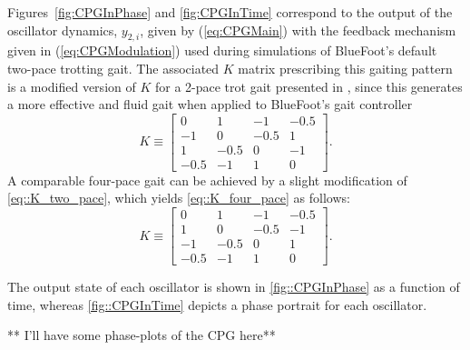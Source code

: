 			Figures~\ref{fig:CPGInPhase} and \ref{fig:CPGInTime} correspond to the output of the oscillator dynamics, $y_{2,i}$, given by (\ref{eq:CPGMain}) with the feedback mechanism given in (\ref{eq:CPGModulation})  used during simulations of BlueFoot's default two-pace trotting gait. The associated $K$ matrix prescribing this gaiting pattern is a modified version of $K$ for a 2-pace trot gait presented in \cite{Rutishauser2008}, since this generates a more effective and fluid gait when applied to BlueFoot's gait controller
				\begin{equation}
						K\equiv 
						\left[ 
						\begin{array}{cccc}
						 0	   	&	 1   	&	 	-1   	&		-0.5\\
						-1	   	&	 0   	&	 	-0.5   	&		 1 	\\
						 1    	&	-0.5   	&		0    	&	 	-1 	\\
						-0.5	&	-1   	&		1    	&		 0
						\end{array}
						\right].
						\label{eq::K_two_pace}
				\end{equation}
			A comparable four-pace gait can be achieved by a slight modification of \ref{eq::K_two_pace}, which yields \ref{eq::K_four_pace} as follows:
				\begin{equation}
						K\equiv 
						\left[ 
						\begin{array}{cccc}
						 0	   	&	 1   	&	 	-1   	&		-0.5\\
						 1	   	&	 0   	&	 	-0.5   	&		-1 	\\
						-1    	&	-0.5   	&		0    	&	 	 1 	\\
						-0.5	&	-1   	&		1    	&		 0
						\end{array}
						\right].
						\label{eq::K_four_pace}
				\end{equation}

			The output state of each \Ith oscillator is shown in \ref{fig::CPGInPhase} as a function of time, whereas \ref{fig::CPGInTime} depicts a phase portrait for each \Ith oscillator.  

			** I'll have some phase-plots of the CPG here**





